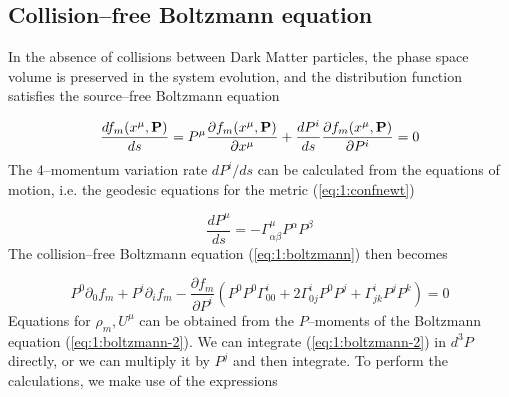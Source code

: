 \subsection{Collision--free Boltzmann equation}
In the absence of collisions between Dark Matter particles, the phase space volume is preserved in the system evolution, and the distribution function satisfies the source--free Boltzmann equation 

\begin{equation}
\label{eq:1:boltzmann}
\frac{df_m(x^\mu,\mathbf{P})}{ds} = P^\mu\frac{\partial f_m(x^\mu,\mathbf{P})}{\partial x^\mu} + \frac{d P^i}{ds}\frac{\partial f_m(x^\mu,\mathbf{P})}{\partial P^i} = 0
\end{equation}
%
The 4--momentum variation rate $dP^i/ds$ can be calculated from the equations of motion, i.e. the geodesic equations for the metric (\ref{eq:1:confnewt})

\begin{equation}
\label{eq:1:geodesic}
\frac{dP^\mu}{ds} = -\Gamma^\mu_{\alpha\beta}P^\alpha P^\beta
\end{equation}
%
The collision--free Boltzmann equation (\ref{eq:1:boltzmann}) then becomes

\begin{equation}
\label{eq:1:boltzmann-2}
P^0\partial_0 f_m + P^i\partial_i f_m - \frac{\partial f_m}{\partial P^i}\left(P^0P^0\Gamma_{00}^i + 2\Gamma_{0j}^iP^0P^j + \Gamma_{jk}^i P^jP^k \right) = 0
\end{equation}
%
Equations for $\rho_m,U^\mu$ can be obtained from the $P$--moments of the Boltzmann equation (\ref{eq:1:boltzmann-2}). We can integrate (\ref{eq:1:boltzmann-2}) in $d^3P$ directly, or we can multiply it by $P^j$ and then integrate. To perform the calculations, we make use of the expressions

